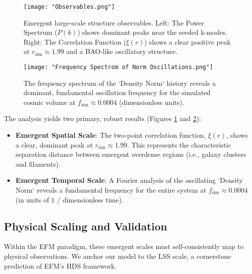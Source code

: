 \documentclass[11pt]{article}
\begin{document}
\begin{figure}[htbp]
\centering
\texttt{[image: "Observables.png"]}
\caption{Emergent large-scale structure observables. Left: The Power Spectrum (\(P(k)\)) shows dominant peaks near the seeded k-modes. Right: The Correlation Function (\(\xi(r)\)) shows a clear positive peak at \(r_{\text{sim}} \approx 1.99\) and a BAO-like oscillatory structure.}
\label{fig:lss_observables}
\end{figure}

\begin{figure}[htbp]
\centering
\texttt{[image: "Frequency Spectrom of Norm Oscillations.png"]}
\caption{The frequency spectrum of the `Density Norm` history reveals a dominant, fundamental oscillation frequency for the simulated cosmic volume at \(f_{\text{sim}} \approx 0.0004\) (dimensionless units).}
\label{fig:frequency_spectrum}
\end{figure}

The analysis yields two primary, robust results (Figures \ref{fig:lss_observables} and \ref{fig:frequency_spectrum}):
\begin{itemize}
    \item \textbf{Emergent Spatial Scale}: The two-point correlation function, \(\xi(r)\), shows a clear, dominant peak at \(r_{\text{sim}} \approx 1.99\). This represents the characteristic separation distance between emergent overdense regions (i.e., galaxy clusters and filaments).
    \item \textbf{Emergent Temporal Scale}: A Fourier analysis of the oscillating `Density Norm` reveals a fundamental frequency for the entire system at \(f_{\text{sim}} \approx 0.0004\) (in units of 1 / dimensionless time).
\end{itemize}

\subsection{Physical Scaling and Validation}
Within the EFM paradigm, these emergent scales must self-consistently map to physical observations. We anchor our model to the LSS scale, a cornerstone prediction of EFM's HDS framework.
\end{document}
